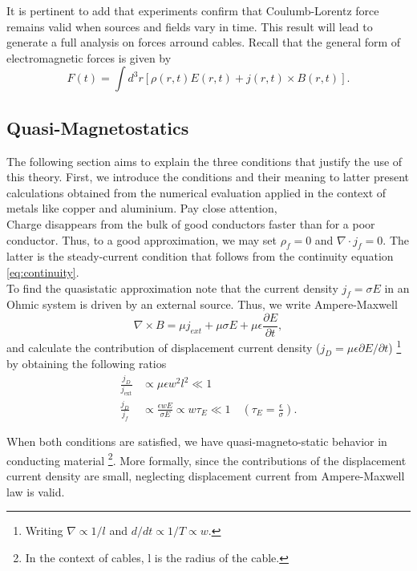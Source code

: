 It is pertinent to add that experiments confirm that Coulumb-Lorentz force remains valid when sources and fields vary in time. This result will lead to generate a full analysis on forces arround cables. Recall that the general form of electromagnetic forces is given by
\begin{equation}
    \label{eq:force}
    F(t) = \int d^3r [\rho(r,t) E(r,t) + j(r,t) \times B(r,t)].
\end{equation}

\subsection{Quasi-Magnetostatics}
The following section aims to explain the three conditions that justify the use of this theory. First, we introduce the conditions and their meaning to latter present calculations obtained from the numerical evaluation applied in the context of metals like copper and aluminium. Pay close attention,
\\

Charge disappears from the bulk of good conductors faster than for a poor conductor. Thus, to a good approximation, we may set $\rho_f = 0$ and   $\nabla\cdot j_f = 0$. The latter is the steady-current condition that follows from the continuity equation \ref{eq:continuity}. 
\\
To find the quasistatic approximation note that the current density $ j_f = \sigma E $ in an Ohmic system is driven by an external source. Thus, we write Ampere-Maxwell
\begin{equation}
    \nabla \times B = \mu j_{ext} +\mu \sigma E + \mu \epsilon \frac{\partial E}{\partial t},
\end{equation}
 and calculate the contribution of displacement current density ($j_D = \mu \epsilon \partial E / \partial t$) \footnote{Writing $\nabla \propto 1/l$ and $d/dt \propto 1/T \propto w$.} by obtaining the following ratios
\begin{align}
\label{eq:quasimagnetostatic-condition}
\frac{j_D}{j_{\text{ext}}} &\propto \mu \epsilon w^2 l^2 \ll 1 \\
\frac{j_D}{j_f} &\propto \frac{\epsilon w E}{\sigma E} \propto w\tau_E \ll 1 \quad (\tau_E=\frac{\epsilon}{\sigma}).
\end{align}
 
When both conditions are satisfied, we have quasi-magneto-static behavior in conducting material \footnote{In the context of cables, l is the radius of the cable.}. More formally, since the contributions of the displacement current density are small, neglecting displacement current from Ampere-Maxwell law is valid. 
\\  %

